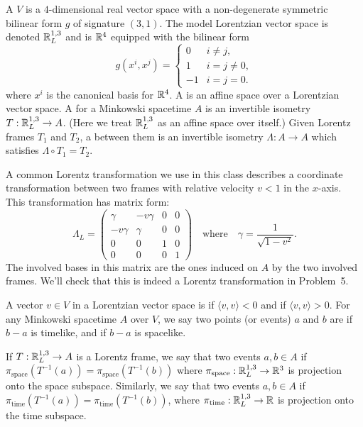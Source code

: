 \documentclass{../../templates/lkx_pset}
\begin{document}
\begin{definition}
	A  $V$ is a $4$-dimensional real vector space with a non-degenerate symmetric bilinear form $g$ of signature $(3,1)$. The model Lorentzian vector space is denoted $\mathbb{R}^{1,3}_L$ and is $\mathbb{R}^4$ equipped with the bilinear form
	\[
		g(x^i, x^j) = \begin{cases} 0 & i \neq j, \\ 1 & i = j \neq 0, \\ -1 & i = j = 0.\end{cases}
	\]
	where $x^i$ is the canonical basis for $\mathbb{R}^4$. A  is an affine space over a Lorentzian vector space.
	A  for a Minkowski spacetime $A$ is an invertible isometry $T : \mathbb{R}^{1,3}_L \to A$. (Here we treat $\mathbb{R}^{1,3}_L$ as an affine space over itself.)
	Given Lorentz frames $T_1$ and $T_2$, a  between them is an invertible isometry $\Lambda : A \to A$ which satisfies $\Lambda \circ T_1 = T_2$.
\end{definition}

A common Lorentz transformation we use in this class describes a coordinate transformation between two frames with relative velocity $v < 1$ in the $x$-axis. This transformation has matrix form:
\[
	\Lambda_{L} =
	\begin{pmatrix}
		\gamma   & -v\gamma & 0 & 0 \\
		-v\gamma & \gamma   & 0 & 0 \\
		0        & 0        & 1 & 0 \\
		0        & 0        & 0 & 1
	\end{pmatrix}\quad\textrm{where}\quad \gamma = \frac{1}{\sqrt{1-v^2}}.
\]
The involved bases in this matrix are the ones induced on $A$ by the two involved frames. We'll check that this is indeed a Lorentz transformation in Problem~5.

\begin{definition}
	A vector $v\in V$ in a Lorentzian vector space is  if $\langle v, v\rangle < 0$ and  if $\langle v, v\rangle > 0$.
	For any Minkowski spacetime $A$ over $V$, we say two points (or events) $a$ and $b$ are  if $b - a$ is timelike, and  if $b-a$ is spacelike.
\end{definition}

\begin{definition}
	If $T : \mathbb{R}^{1,3}_L \to A$ is a Lorentz frame, we say that two events $a,b\in A$  if $\pi_{\textrm{space}}(T^{-1}(a)) = \pi_{\textrm{space}}(T^{-1}(b))$ where $\pi_{\textrm{space}} : \mathbb{R}^{1,3}_L \to \mathbb{R}^3$ is projection onto the space subspace. Similarly, we say that two events $a,b\in A$  if $\pi_{\textrm{time}}(T^{-1}(a)) = \pi_{\textrm{time}}(T^{-1}(b))$, where $\pi_{\textrm{time}} : \mathbb{R}^{1,3}_L\to \mathbb{R}$ is projection onto the time subspace.
\end{definition}
\end{document}
